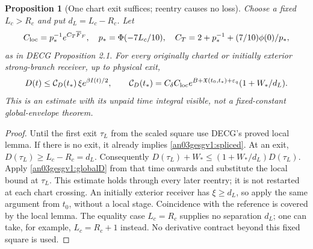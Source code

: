 \documentclass[11pt]{article}
\newtheorem{proposition}{Proposition}[section]
\theoremstyle{remark}\newtheorem{remark}[proposition]{Remark}
\begin{document}
\begin{proposition}[One chart exit suffices; reentry causes no loss]
\label{an03gesgv1:splice}
Choose a fixed $L_c>R_c$ and put $d_L=L_c-R_c$.
Let
\[
 C_{\rm loc}=p_*^{-1}e^{C_T\overline F_F},\quad
 p_* =\Phi(-7L_c/10),\quad
 C_T=2+p_*^{-1}+(7/10)\phi(0)/p_*,
\]
as in DECG Proposition 2.1. For every originally charted or
initially exterior strong-branch receiver, up to physical exit,
\begin{equation}
 D(t)\le \mathcal C_D(t_*)\,\xi e^{\beta I(t)/2},\qquad
 \mathcal C_D(t_*)=
 C_\delta C_{\rm loc}
 e^{B+\mathfrak X(t_0,t_*)+\varepsilon_q}
       (1+W_*/d_L).
 \label{an03gesgv1:spliced}
\end{equation}
This is an estimate with its unpaid time integral visible,
not a fixed-constant global-envelope theorem.
\end{proposition}
\begin{proof}
Until the first exit $\tau_L$ from the scaled square use
DECG's proved local lemma. If there is no exit, it already
implies \eqref{an03gesgv1:spliced}. At an exit,
$D(\tau_L)\ge L_c-R_c=d_L$. Consequently
$D(\tau_L)+W_*\le(1+W_*/d_L)D(\tau_L)$.
Apply \eqref{an03gesgv1:globalD} from that time onwards and
substitute the local bound at $\tau_L$. This estimate holds
through every later reentry; it is not restarted at each chart
crossing. An initially exterior receiver has $\xi\ge d_L$,
so apply the same argument from $t_0$, without a local stage.
Coincidence with the reference is covered by the local lemma.
The equality case $L_c=R_c$ supplies no separation $d_L$;
one can take, for example, $L_c=R_c+1$ instead. No derivative
contract beyond this fixed square is used.
\end{proof}
\end{document}
